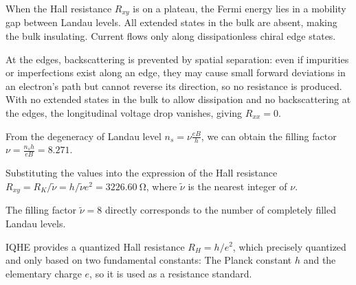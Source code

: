 \begin{solution}\leavevmode
  \begin{enumext}
    \item When the Hall resistance $R_{xy}$ is on a plateau, the Fermi energy
    lies in a mobility gap between Landau levels. All extended states in the
    bulk are absent, making the bulk insulating. Current flows only along
    dissipationless chiral edge states.
    
    At the edges, backscattering is prevented by spatial separation: even if
    impurities or imperfections exist along an edge, they may cause small
    forward deviations in an electron's path but cannot reverse its direction,
    so no resistance is produced. With no extended states in the bulk to allow
    dissipation and no backscattering at the edges, the longitudinal voltage
    drop vanishes, giving $R_{xx} = 0$.
    \item \begin{enumext}
      \item From the degeneracy of Landau level $n_s = \nu \frac{eB}{h}$,
      we can obtain the filling factor $\nu = \frac{n_sh}{eB} = 8.271$.
      \item Substituting the values into the expression of the Hall resistance
      $R_{xy} = R_K/\tilde\nu = h/\tilde\nu e^2 = \qty{3226.60}\ohm$,
      where $\tilde \nu$ is the nearest integer of $\nu$.
      \item The filling factor $\tilde \nu = 8$ directly corresponds to the
      number of completely filled Landau levels.
    \end{enumext}
    \item IQHE provides a quantized Hall resistance $R_H = h/e^2$,
    which precisely quantized and only based on two fundamental constants:
    The Planck constant $h$ and the elementary charge $e$, so it is used as
    a resistance standard.
  \end{enumext}
\end{solution}


